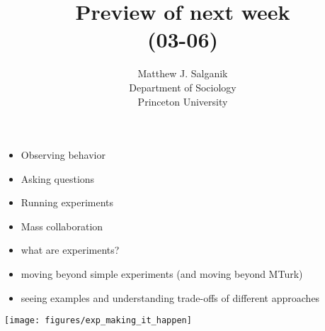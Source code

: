 \documentclass[aspectratio=169]{beamer}
\title[]{Preview of next week\\(03-06)}
\author[]{Matthew J. Salganik\\Department of Sociology\\Princeton University}
\date[]{Soc 596: Computational Social Science\\Fall 2016
\vfill
\begin{flushright}
\vspace{0.6in}
\texttt{[image: figures/cc.png]}
\end{flushright}
}
\begin{document}
\frame{\titlepage}
\begin{frame}

\begin{itemize}
\item Observing behavior
\item Asking questions
\item Running experiments
\item Mass collaboration
\end{itemize}

\end{frame}
\begin{frame}

\begin{itemize}
\item what are experiments?
\item moving beyond simple experiments (and moving beyond MTurk)
\item seeing examples and understanding trade-offs of different approaches
\end{itemize}

\texttt{[image: figures/exp\_making\_it\_happen]}


\end{frame}
\end{document}
